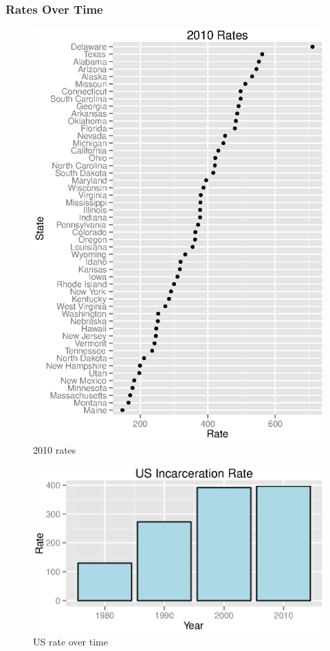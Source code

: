 \documentclass{exam}
\begin{document}
  \subsubsection{Rates Over Time}
  \begin{figure}[H]
    \centering
    \includegraphics[scale = 0.9]{figures/state_rates_2010.eps}
    \caption{2010 rates}
  \end{figure}

  \begin{figure}[H]
    \centering
    \includegraphics[scale = 0.9]{figures/us_rate_over_time.eps}
    \caption{US rate over time}
  \end{figure}
\end{document}
